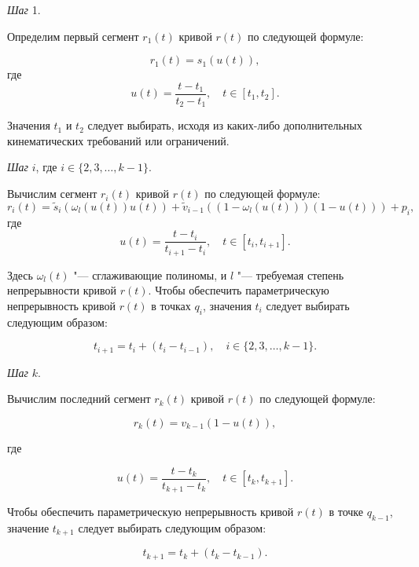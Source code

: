 \bigskip
\textit{Шаг} 1.

Определим первый сегмент $r_1(t)$ кривой $r(t)$ по следующей формуле:

$$
r_1(t)=s_1(u(t)),
$$
\noindent где
$$
u(t)=\frac{t-t_1}{t_2-t_1}, \quad t \in [t_1,t_2].
$$

Значения $t_1$ и $t_2$ следует выбирать, исходя из каких-либо дополнительных кинематических требований или ограничений.

\bigskip
\textit{Шаг} $i$, где $i \in \{2,3,\dots,k-1\}$.

Вычислим сегмент $r_i(t)$ кривой $r(t)$ по следующей формуле:
$$
r_i(t)=\tilde s_i(\omega_l(u(t))u(t))+\tilde v_{i-1}((1-\omega_l(u(t)))(1-u(t)))+p_i,
$$
\noindent где
$$
u(t)=\frac{t-t_i}{t_{i+1}-t_i}, \quad t \in [t_i,t_{i+1}].
$$

Здесь $\omega_l(t)$ "--- сглаживающие полиномы, и $l$ "--- требуемая степень непрерывности кривой $r(t)$. Чтобы обеспечить
параметрическую непрерывность кривой $r(t)$ в точках $q_i$, значения $t_i$ следует выбирать следующим образом:

$$
t_{i+1}=t_i+(t_i-t_{i-1}), \quad i \in \{2,3,\dots,k-1\}.
$$

\bigskip
\textit{Шаг} $k$.

Вычислим последний сегмент $r_k(t)$ кривой $r(t)$ по следующей формуле:

$$
r_k(t)=v_{k-1}(1-u(t)),
$$

\noindent где

$$
u(t)=\frac{t-t_k}{t_{k+1}-t_k}, \quad t \in [t_k,t_{k+1}].
$$

Чтобы обеспечить параметрическую непрерывность кривой $r(t)$ в точке $q_{k-1}$, значение $t_{k+1}$ следует выбирать
следующим образом:

$$
t_{k+1}=t_k+(t_k-t_{k-1}).
$$
